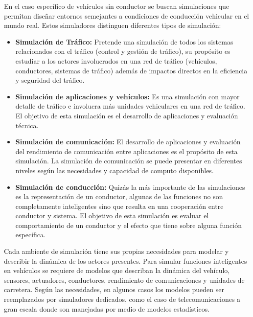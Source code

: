 En el caso específico de vehículos sin conductor se buscan simulaciones que permitan diseñar entornos semejantes a condiciones de conducción vehicular en el mundo real. Estos simuladores distinguen diferentes tipos de simulación:
\begin{itemize}
    \item \textbf{Simulación de Tráfico:} Pretende una simulación de todos los sistemas relacionados con el tráfico (control y gestión de tráfico), su propósito es estudiar a los actores involucrados en una red de tráfico (vehículos, conductores, sistemas de tráfico) además de impactos directos en la eficiencia y seguridad del tráfico.
    
    \item \textbf{Simulación de aplicaciones y vehículos:} Es una simulación con mayor detalle de tráfico e involucra más unidades vehiculares en una red de tráfico. El objetivo de esta simulación es el desarrollo de aplicaciones y evaluación técnica.
    
    \item \textbf{Simulación de comunicación:} El desarrollo de aplicaciones y evaluación del rendimiento de comunicación entre aplicaciones es el propósito de esta simulación. La simulación de comunicación se puede presentar en diferentes niveles según las necesidades y capacidad de computo disponibles.
    
    \item \textbf{Simulación de conducción:} Quizás la más importante de las simulaciones es la representación de un conductor, algunas de las funciones no son completamente inteligentes sino que resulta en una cooperación entre conductor y sistema. El objetivo de esta simulación es evaluar el comportamiento de un conductor y el efecto que tiene sobre alguna función específica.
\end{itemize}

Cada ambiente de simulación tiene sus propias necesidades para modelar y describir la dinámica de los actores presentes. Para simular funciones inteligentes en vehículos se requiere de modelos que describan la dinámica del vehículo, sensores, actuadores, conductores, rendimiento de comunicaciones y unidades de carretera. Según las necesidades, en algunos casos los modelos pueden ser reemplazados por simuladores dedicados, como el caso de telecomunicaciones a gran escala donde son manejadas por medio de  modelos estadísticos\cite{eskandarian2012handbook}.

